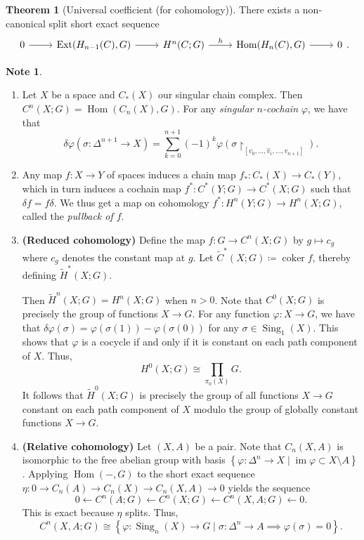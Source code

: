 \documentclass[10pt,letterpaper,cm]{nupset}
\theoremstyle{definition}
\newtheorem{note}[definition]{Note}
\theoremstyle{theorem}
\newtheorem{theorem}[definition]{Theorem}
\theoremstyle{remark}
\newcommand{\1}{\mathbb{1}}
\newcommand{\0}{\vec 0}
\newcommand{\from}{\longleftarrow}
\DeclareMathOperator{\im}{im}
\DeclareMathOperator{\ext}{Ext}
\DeclareMathOperator{\Hom}{Hom}
\DeclareMathOperator{\coker}{coker}
\DeclareMathOperator{\sing}{Sing}
\begin{document}
\begin{theorem}[Universal coefficient (for cohomology)]
There exists a non-canonical split short exact sequence $$\begin{tikzcd}
0 \arrow[r] & \ext(H_{n-1}(C), G) \arrow[r] & H^n(C; G) \arrow[r, "h"] & \Hom(H_n(C), G) \arrow[r] & 0
\end{tikzcd}     .$$
\end{theorem}

\begin{note} $ $
\begin{enumerate}
\item Let $X$ be a space and $C_{\ast}(X)$ our singular chain complex. Then $C^n(X; G) = \Hom(C_n(X), G)$. For any \textit{singular $n$-cochain} $\varphi$, we have that $$\delta{\varphi}(\sigma : \Delta^{n+1} \to X) = \sum_{k=0}^{n+1}({-1})^k\varphi(\sigma \restriction_{ [v_0, \ldots, \hat{v}_i, \ldots, v_{n+1}]}).$$ 
\item Any map $f: X \to Y$ of spaces induces a chain map $f_{\ast} : C_{\ast}(X) \to C_{\ast}(Y)$, which in turn induces a cochain map $f^{\ast} : C^{\ast}(Y; G) \to C^{\ast}(X; G)$ such that $\delta{f} = f{\delta}$.  We thus get a map on cohomology $f^{\ast} : H^n(Y; G) \to H^n(X;G)$, called the \textit{pullback of $f$}.
\item  {\textbf{(Reduced cohomology)}} Define the map $f : G \to C^n(X; G)$ by $g \mapsto c_g$ where $c_g$ denotes the constant map at $g$. Let $\widetilde{C}^{\ast}(X; G) \coloneqq  \coker{f}$, thereby defining $\widetilde{H}^{\ast}(X; G)$.

Then $\widetilde{H}^n(X; G) = H^n(X; G)$ when $n>0$. Note that $C^0(X; G)$ is precisely the group of functions $X \to G$. For any function $\varphi : X \to G$, we have that $\delta{\varphi}(\sigma) = \varphi(\sigma(1)) - \varphi(\sigma(0))$ for any $\sigma \in \sing_1(X)$. This shows that $\varphi$ is a cocycle if and only if it is constant on each path component of $X$. Thus, $$H^0(X; G) \cong \prod_{\pi_0(X)} G.$$ It follows that $\widetilde{H}^0(X; G)$ is precisely the group of all functions $X \to G$ constant on each path component of $X$ modulo the group of globally constant functions $X \to G$.
\item  {\textbf{(Relative cohomology)}} Let $\left(X, A\right)$ be a pair.  Note that $C_n(X,A)$ is isomorphic to the free abelian group with basis $\left\{\varphi : \Delta^n \to X \mid \im{\varphi} \subset X \setminus A\right\}$. Applying $\Hom({-}, G)$ to the short exact sequence $\eta: 0 \to C_n(A) \to C_n(X) \to C_n(X,A) \to 0$ yields the sequence $$ 0 \from C^n(A; G) \from C^n(X; G) \from C^n(X, A; G) \from 0  .$$ This is exact because $\eta$ splits. Thus, $$ C^n(X, A; G) \cong 
\left\{\varphi : \sing_n(X) \to G \mid \sigma : \Delta^n \to A \implies \varphi(\sigma) = 0\right\}.$$
\end{enumerate}
\end{note}
\end{document}
